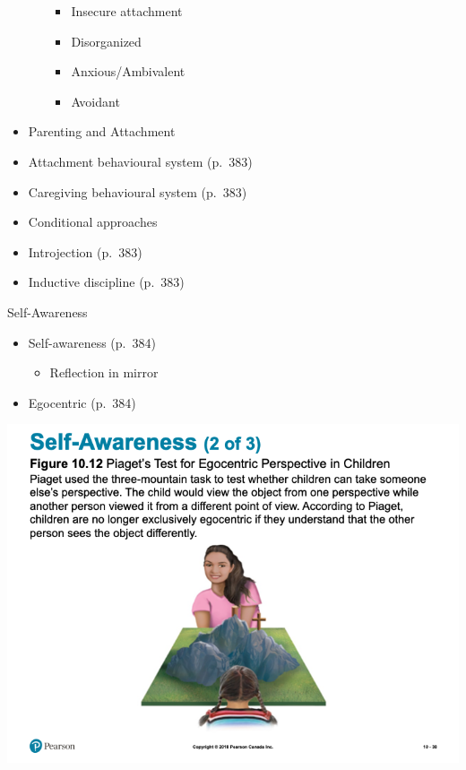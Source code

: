\documentclass[
]{book}
\providecommand{\tightlist}{%
  \setlength{\itemsep}{0pt}\setlength{\parskip}{0pt}}
\begin{document}
\begin{reflect}
\begin{itemize}
\begin{itemize}
    \begin{itemize}
    \tightlist
    \item
      Insecure attachment\\
    \item
      Disorganized\\
    \item
      Anxious/Ambivalent\\
    \item
      Avoidant\\
    \end{itemize}
  \end{itemize}
\item
  Parenting and Attachment\\
\item
  Attachment behavioural system (p.~383)\\
\item
  Caregiving behavioural system (p.~383)\\
\item
  Conditional approaches\\
\item
  Introjection (p.~383)\\
\item
  Inductive discipline (p.~383)
\end{itemize}

Self-Awareness

\begin{itemize}
\tightlist
\item
  Self-awareness (p.~384)

  \begin{itemize}
  \tightlist
  \item
    Reflection in mirror\\
  \end{itemize}
\item
  Egocentric (p.~384)
\end{itemize}

\includegraphics{assets/unit_3/slide_38.png}


\end{reflect}
\end{document}
